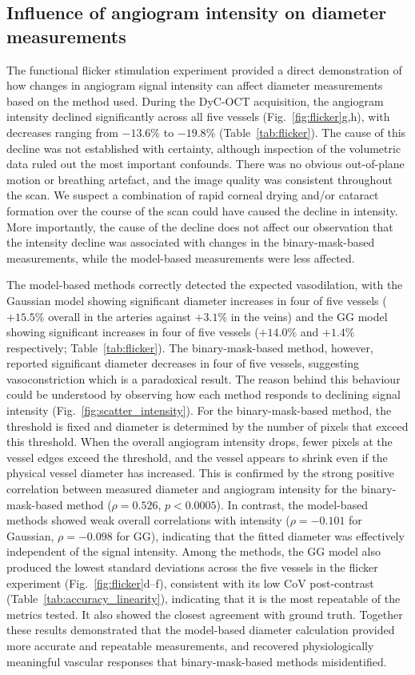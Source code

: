 \documentclass{optica-article}
\begin{document}
\subsection{Influence of angiogram intensity on diameter measurements}
\label{subsec:influence_of_intensity}
The functional flicker stimulation experiment provided a direct demonstration of how changes in angiogram signal intensity can affect diameter measurements based on the method used. During the DyC-OCT acquisition, the angiogram intensity declined significantly across all five vessels (Fig.~\ref{fig:flicker}g,h), with decreases ranging from $-13.6\%$ to $-19.8\%$ (Table~\ref{tab:flicker}). The cause of this decline was not established with certainty, although inspection of the volumetric data ruled out the most important confounds. There was no obvious out-of-plane motion or breathing artefact, and the image quality was consistent throughout the scan. We suspect a combination of rapid corneal drying and/or cataract formation over the course of the scan could have caused the decline in intensity. More importantly, the cause of the decline does not affect our observation that the intensity decline was associated with changes in the binary-mask-based measurements, while the model-based measurements were less affected. 

The model-based methods correctly detected the expected vasodilation, with the Gaussian model showing significant diameter increases in four of five vessels ($+15.5\%$ overall in the arteries against $+3.1\%$ in the veins) and the GG model showing significant increases in four of five vessels ($+14.0\%$ and $+1.4\%$ respectively; Table~\ref{tab:flicker}). The binary-mask-based method, however, reported significant diameter decreases in four of five vessels, suggesting vasoconstriction which is a paradoxical result. The reason behind this behaviour could be understood by observing how each method responds to declining signal intensity (Fig.~\ref{fig:scatter_intensity}). For the binary-mask-based method, the threshold is fixed and diameter is determined by the number of pixels that exceed this threshold. When the overall angiogram intensity drops, fewer pixels at the vessel edges exceed the threshold, and the vessel appears to shrink even if the physical vessel diameter has increased. This is confirmed by the strong positive correlation between measured diameter and angiogram intensity for the binary-mask-based method ($\rho = 0.526$, $p < 0.0005$). In contrast, the model-based methods showed weak overall correlations with intensity ($\rho = -0.101$ for Gaussian, $\rho = -0.098$ for GG), indicating that the fitted diameter was effectively independent of the signal intensity. Among the methods, the GG model also produced the lowest standard deviations across the five vessels in the flicker experiment (Fig.~\ref{fig:flicker}d--f), consistent with its low CoV post-contrast (Table~\ref{tab:accuracy_linearity}), indicating that it is the most repeatable of the metrics tested. It also showed the closest agreement with ground truth. Together these results demonstrated that the model-based diameter calculation provided more accurate and repeatable measurements, and recovered physiologically meaningful vascular responses that binary-mask-based methods misidentified.
\end{document}

